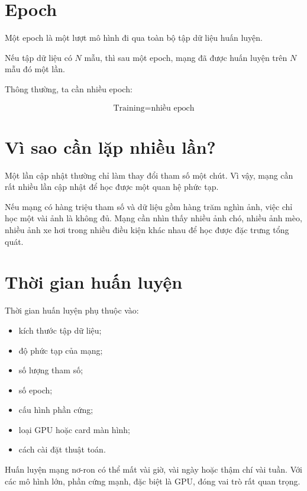 \documentclass[12pt,a4paper]{report}
\begin{document}
\section{Epoch}

Một epoch là một lượt mô hình đi qua toàn bộ tập dữ liệu huấn luyện.

Nếu tập dữ liệu có $N$ mẫu, thì sau một epoch, mạng đã được huấn luyện trên $N$ mẫu đó một lần.

Thông thường, ta cần nhiều epoch:

\[
    \text{Training} = \text{nhiều epoch}
\]

\section{Vì sao cần lặp nhiều lần?}

Một lần cập nhật thường chỉ làm thay đổi tham số một chút. Vì vậy, mạng cần rất nhiều lần cập nhật để học được một quan hệ phức tạp.

\begin{vidu}
Nếu mạng có hàng triệu tham số và dữ liệu gồm hàng trăm nghìn ảnh, việc chỉ học một vài ảnh là không đủ. Mạng cần nhìn thấy nhiều ảnh chó, nhiều ảnh mèo, nhiều ảnh xe hơi trong nhiều điều kiện khác nhau để học được đặc trưng tổng quát.
\end{vidu}

\section{Thời gian huấn luyện}

Thời gian huấn luyện phụ thuộc vào:

\begin{itemize}
    \item kích thước tập dữ liệu;
    \item độ phức tạp của mạng;
    \item số lượng tham số;
    \item số epoch;
    \item cấu hình phần cứng;
    \item loại GPU hoặc card màn hình;
    \item cách cài đặt thuật toán.
\end{itemize}

\begin{luuy}
Huấn luyện mạng nơ-ron có thể mất vài giờ, vài ngày hoặc thậm chí vài tuần. Với các mô hình lớn, phần cứng mạnh, đặc biệt là GPU, đóng vai trò rất quan trọng.
\end{luuy}
\end{document}
